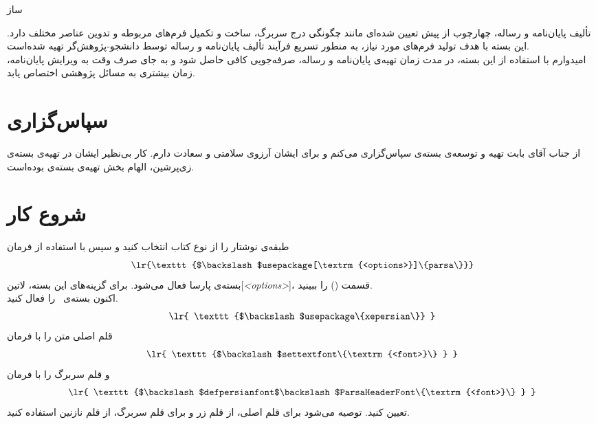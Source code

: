 \documentclass[12pt,a4paper,twoside,fleqn,notitlepage,openany]{extarticle}
\begin{document}
\pagestyle{plain}
‌ساز
\begin{center}
\begin{minipage}{0.67\textwidth}
تألیف پایان‌نامه و رساله، چهارچوب از پیش تعیین شده‌ای مانند چگونگی درج سربرگ، ساخت و تکمیل فرم‌های مربوطه و تدوین عناصر مختلف دارد\@. این بسته با هدف تولید فرم‌های مورد نیاز، به منطور تسریع فرآیند تألیف پایان‌نامه و رساله توسط دانشجو-پژوهش‌گر تهیه شده‌است\@. \\
امیدوارم با استفاده از این بسته، در مدت زمان تهیه‌ی پایان‌نامه و رساله، صرفه‌جویی کافی حاصل شود و به جای صرف وقت به ویرایش پایان‌نامه، زمان بیشتری به مسائل پژوهشی اختصاص یابد\@.
\end{minipage}
\end{center}
\tableofcontents
\section*{سپاس‌گزاری}
از جناب آقای  بابت تهیه و توسعه‌ی بسته‌ی  سپاس‌گزاری می‌کنم و برای ایشان آرزوی سلامتی و سعادت دارم\@. کار بی‌نظیر ایشان در تهیه‌ی بسته‌ی زی‌پرشین، الهام بخش تهیه‌ی بسته‌ی  بوده‌است.

\section{شروع کار}
طبقه‌ی نوشتار  را از نوع کتاب انتخاب کنید و سپس با استفاده از فرمان
\[\textrm{\lr{\texttt{$\backslash$usepackage[\textrm{<options>}]\{parsa\}}}}\]
بسته‌ی پارسا فعال می‌شود\@. برای گزینه‌های این بسته، ‌لاتین{[\emph{<options>}]}، قسمت () را ببینید.\\
اکنون بسته‌ی \XePersian ~را فعال کنید\@.
\[ \textrm{ \lr{ \texttt{$\backslash$usepackage\{xepersian\}} } } \]
قلم اصلی متن را با فرمان
\[ \textrm{ \lr{ \texttt{$\backslash$settextfont\{\textrm{<font>}\} } } } \]
و قلم سربرگ را با فرمان
\[ \textrm{ \lr{ \texttt{$\backslash$defpersianfont$\backslash$ParsaHeaderFont\{\textrm{<font>}\} } } } \]
تعیین کنید\@. توصیه می‌شود برای قلم اصلی، از قلم زر  و برای قلم سربرگ، از قلم نازنین  استفاده کنید\@.
\end{document}
